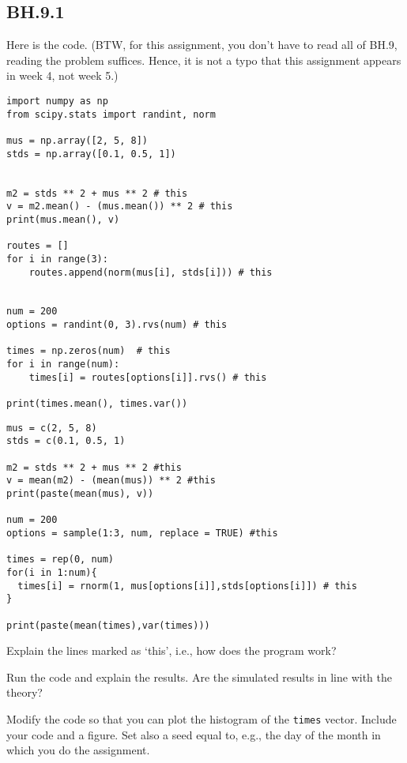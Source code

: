 \subsection{BH.9.1}
\label{sec:bh.9.1}

Here is the code. (BTW, for this assignment, you don't have to read all of BH.9, reading the problem suffices. Hence, it is not a typo that this assignment appears in week 4, not week 5.)

\begin{verbatim}
import numpy as np
from scipy.stats import randint, norm

mus = np.array([2, 5, 8])
stds = np.array([0.1, 0.5, 1])


m2 = stds ** 2 + mus ** 2 # this
v = m2.mean() - (mus.mean()) ** 2 # this
print(mus.mean(), v)

routes = []
for i in range(3):
    routes.append(norm(mus[i], stds[i])) # this


num = 200
options = randint(0, 3).rvs(num) # this

times = np.zeros(num)  # this
for i in range(num):
    times[i] = routes[options[i]].rvs() # this

print(times.mean(), times.var())
\end{verbatim}

\begin{verbatim}
mus = c(2, 5, 8)
stds = c(0.1, 0.5, 1)

m2 = stds ** 2 + mus ** 2 #this
v = mean(m2) - (mean(mus)) ** 2 #this
print(paste(mean(mus), v))

num = 200
options = sample(1:3, num, replace = TRUE) #this

times = rep(0, num)
for(i in 1:num){
  times[i] = rnorm(1, mus[options[i]],stds[options[i]]) # this
}

print(paste(mean(times),var(times)))
\end{verbatim}

\begin{exercise}
Explain the lines marked as `this', i.e., how does the program work?
\end{exercise}

\begin{exercise}
Run the code and explain the results. Are the simulated results in line with the theory?
\end{exercise}

\begin{exercise}
Modify the code so that you can plot the histogram of the \verb|times| vector. Include your code and a figure. Set also a seed equal to, e.g.,  the day of the month in which you do the assignment.
\end{exercise}


